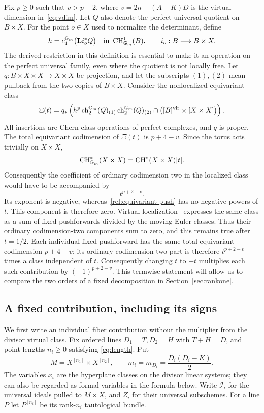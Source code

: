 Fix $p\geq 0$ such that $v>p+2$, where
$v=2n+(A-K)D$ is the virtual dimension in~\eqref{eq:vdim}.
Let $Q$ also denote the perfect universal quotient on $B\times X$.
For the point $o\in X$ used to normalize the determinant, define
\[
 h=c_1^{\mathbb G_m}\bigl(\mathbf L i_o^*Q\bigr)
 \quad\text{in }\operatorname{CH}^1_{\mathbb G_m}(B),
 \qquad i_o:B\longrightarrow B\times X.
\]
The derived restriction in this definition is essential to make it an
operation on the perfect universal family, even where the quotient is
not locally free.  Let $q:B\times X\times X\to X\times X$ be projection,
and let the subscripts $(1),(2)$ mean pullback from the two copies of
$B\times X$.  Consider the nonlocalized equivariant class
\begin{equation}
 \Xi(t)=q_*\left(
 h^p\operatorname{ch}^{\mathbb G_m}_2(Q)_{(1)}
       \operatorname{ch}^{\mathbb G_m}_2(Q)_{(2)}
 \cap\bigl([B]^{\mathrm{vir}}\times[X\times X]\bigr)\right).
 \label{rel:equivariant-push}
\end{equation}
All insertions are Chern-class operations of perfect complexes, and $q$
is proper.  The total equivariant codimension of $\Xi(t)$ is $p+4-v$.
Since the torus acts trivially on $X\times X$,
\[
 \operatorname{CH}^*_{\mathbb G_m}(X\times X)
 =\operatorname{CH}^*(X\times X)[t].
\]
Consequently the coefficient of ordinary codimension two in the
localized class would have to be accompanied by
\begin{equation}
 t^{p+2-v}.
 \label{rel:parameter-power}
\end{equation}
Its exponent is negative, whereas~\eqref{rel:equivariant-push} has no
negative powers of $t$.  This component is therefore zero.  Virtual
localization~\cite{GP} expresses the same class as a sum of fixed
pushforwards divided by the moving Euler classes.  Thus their ordinary
codimension-two components sum to zero, and this remains true after
$t=1/2$.  Each individual fixed pushforward has the same total
equivariant codimension $p+4-v$: its ordinary codimension-two part
is therefore $t^{p+2-v}$ times a class independent of $t$.
Consequently changing $t$ to $-t$ multiplies each such contribution
by $(-1)^{p+2-v}$.  This termwise statement will allow us to compare
the two orders of a fixed decomposition in Section~\ref{sec:rankone}.

\subsection{A fixed contribution, including its signs}

We first write an individual fiber contribution without the multiplier
from the divisor virtual class.  Fix ordered lines
$D_1=T,D_2=H$ with $T+H=D$, and point lengths $n_i\geq0$ satisfying
\eqref{eq:length}.  Put
\[
 M=X^{[n_1]}\times X^{[n_2]},\qquad
 m_i=m_{D_i}=\frac{D_i(D_i-K)}2.
\]
The variables $x_i$ are the hyperplane classes on the divisor linear
systems; they can also be regarded as formal variables in the formula
below.  Write $\mathcal I_i$ for the universal ideals pulled to
$M\times X$, and $Z_i$ for their universal subschemes.  For a line $P$
let $P^{[n_i]}$ be its rank-$n_i$ tautological bundle.

